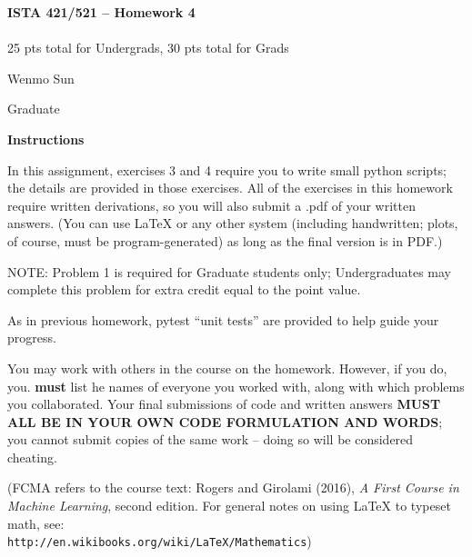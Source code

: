 \documentclass[10pt]{article}
\newcommand{\latex}{\LaTeX\xspace}
\begin{document}
\begin{center}
    {\Large {\bf ISTA 421/521 -- Homework 4}} \\
     \\
    25 pts total for Undergrads, 30 pts total for Grads\\
    
\end{center}

\begin{flushright}
Wenmo Sun %

Graduate %
\end{flushright}

\vspace{1cm}
{\Large {\bf Instructions}}

In this assignment, exercises 3 and 4 require you to write small python scripts; the details are provided in those exercises.  All of the exercises in this homework require written derivations, so you will also submit a .pdf of your written answers.  (You can use \latex or any other system (including handwritten; plots, of course, must be program-generated) as long as the final version is in PDF.)

NOTE: Problem 1 is required for Graduate students only; Undergraduates may complete this problem for extra credit equal to the point value.

As in previous homework, pytest ``unit tests'' are provided to help guide your progress.

You may work with others in the course on the homework. However, if you do, you. {\bf must} list he names of everyone you worked with, along with which problems you collaborated. Your final submissions of code and written answers {\bf MUST ALL BE IN YOUR OWN CODE FORMULATION AND WORDS}; you cannot submit copies of the same work -- doing so will be considered cheating.

(FCMA refers to the course text: Rogers and Girolami (2016), {\em A First Course in Machine Learning}, second edition.  For general notes on using \latex to typeset math, see: \\{\tt http://en.wikibooks.org/wiki/LaTeX/Mathematics})
\vspace{.5cm}



\end{document}
